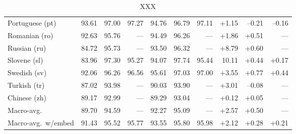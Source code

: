 \documentclass[11pt,letterpaper]{article}
\begin{document}
\begin{table}
\begin{tabular}{l|rrr|rrr|rrr}
Portuguese (pt) & 93.61 & 97.00 & 97.27 & 94.76 & 96.79 & 97.11 & +1.15 & --0.21 & --0.16\\
Romanian (ro) & 92.63 & 95.76 & --- & 94.49 & 96.26 & --- & +1.86 & +0.51 & ---\\
Russian (ru) & 84.72 & 95.73 & --- & 93.50 & 96.32 & --- & +8.79 & +0.60 & ---\\
Slovene (sl) & 83.96 & 97.30 & 95.27 & 94.07 & 97.74 & 95.44 & 10.11 & +0.44 & +0.17\\
Swedish (sv) & 92.06 & 96.26 & 96.56 & 95.61 & 97.03 & 97.00 & +3.55 & +0.77 & +0.44\\
Turkish (tr) & 87.02 & 93.98 & --- & 90.03 & 93.90 & --- & +3.01 & --0.08 & ---\\
Chinese (zh) & 89.17 & 92.99 & --- & 89.29 & 93.04 & --- & +0.12 & +0.05 & ---\\
\midrule
Macro-avg. & 89.70 & 94.59 & --- & 92.27 & 95.09 & --- & +2.57 & +0.50 & ---\\
Macro-avg.~w/embed & 91.43 & 95.52 & 95.77 & 93.55 & 95.80 & 95.98 & +2.12 & +0.28 & +0.21\\
\end{tabular}
\caption{XXX}\label{tbl:results}
\end{table}






\end{document}
